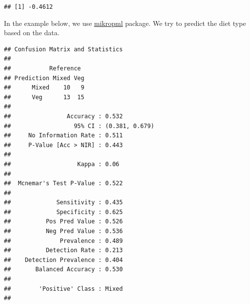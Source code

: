 \documentclass[
]{book}
\newenvironment{Shaded}{\begin{snugshade}}{\end{snugshade}}
\newcommand{\AttributeTok}[1]{\textcolor[rgb]{0.77,0.63,0.00}{#1}}
\newcommand{\CommentTok}[1]{\textcolor[rgb]{0.56,0.35,0.01}{\textit{#1}}}
\newcommand{\DecValTok}[1]{\textcolor[rgb]{0.00,0.00,0.81}{#1}}
\newcommand{\FloatTok}[1]{\textcolor[rgb]{0.00,0.00,0.81}{#1}}
\newcommand{\FunctionTok}[1]{\textcolor[rgb]{0.00,0.00,0.00}{#1}}
\newcommand{\NormalTok}[1]{#1}
\newcommand{\OtherTok}[1]{\textcolor[rgb]{0.56,0.35,0.01}{#1}}
\newcommand{\SpecialCharTok}[1]{\textcolor[rgb]{0.00,0.00,0.00}{#1}}
\newcommand{\StringTok}[1]{\textcolor[rgb]{0.31,0.60,0.02}{#1}}
\begin{document}
\begin{verbatim}
## [1] -0.4612
\end{verbatim}

In the example below, we use \href{https://journals.asm.org/doi/10.1128/mBio.00434-20}{mikropml}
package. We try to predict the diet type based on the data.

\begin{Shaded}
\end{Shaded}

\begin{verbatim}
## Confusion Matrix and Statistics
## 
##           Reference
## Prediction Mixed Veg
##      Mixed    10   9
##      Veg      13  15
##                                         
##                Accuracy : 0.532         
##                  95% CI : (0.381, 0.679)
##     No Information Rate : 0.511         
##     P-Value [Acc > NIR] : 0.443         
##                                         
##                   Kappa : 0.06          
##                                         
##  Mcnemar's Test P-Value : 0.522         
##                                         
##             Sensitivity : 0.435         
##             Specificity : 0.625         
##          Pos Pred Value : 0.526         
##          Neg Pred Value : 0.536         
##              Prevalence : 0.489         
##          Detection Rate : 0.213         
##    Detection Prevalence : 0.404         
##       Balanced Accuracy : 0.530         
##                                         
##        'Positive' Class : Mixed         
## 
\end{verbatim}
\end{document}
